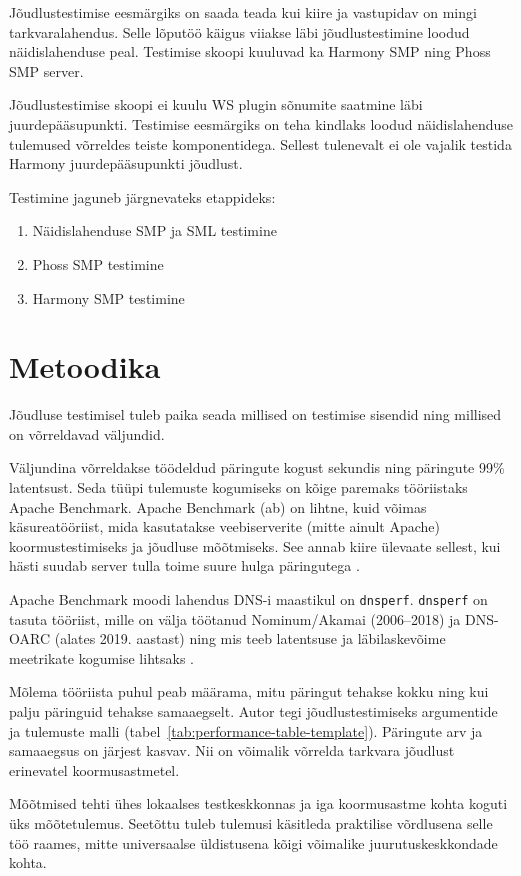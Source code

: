 Jõudlustestimise eesmärgiks on saada teada kui kiire ja vastupidav on mingi tarkvaralahendus.
Selle lõputöö käigus viiakse läbi jõudlustestimine loodud näidislahenduse peal. 
Testimise skoopi kuuluvad ka Harmony SMP ning Phoss SMP server.

Jõudlustestimise skoopi ei kuulu WS plugin sõnumite saatmine läbi juurdepääsupunkti. 
Testimise eesmärgiks on teha kindlaks loodud näidislahenduse tulemused võrreldes teiste komponentidega.
Sellest tulenevalt ei ole vajalik testida Harmony juurdepääsupunkti jõudlust.

Testimine jaguneb järgnevateks etappideks:

\begin{enumerate}
  \item Näidislahenduse SMP ja SML testimine
  \item Phoss SMP testimine
  \item Harmony SMP testimine
\end{enumerate}


\section{Metoodika}
Jõudluse testimisel tuleb paika seada millised on testimise sisendid ning
millised on võrreldavad väljundid.

Väljundina võrreldakse töödeldud päringute kogust sekundis ning päringute 99\% latentsust.
Seda tüüpi tulemuste kogumiseks on kõige paremaks tööriistaks Apache Benchmark. Apache Benchmark (ab)
on lihtne, kuid võimas käsureatööriist, mida kasutatakse veebiserverite (mitte ainult Apache) 
koormustestimiseks ja jõudluse mõõtmiseks. See annab kiire ülevaate sellest, kui hästi suudab 
server tulla toime suure hulga päringutega \cite{apache_ab_tool}. 

Apache Benchmark moodi lahendus DNS-i maastikul on \texttt{dnsperf}. \texttt{dnsperf} on tasuta tööriist,
mille on välja töötanud Nominum/Akamai (2006–2018) ja DNS-OARC (alates 2019. aastast)
ning mis teeb latentsuse ja läbilaskevõime meetrikate kogumise lihtsaks \cite{dnsperf_tool}.

Mõlema tööriista puhul peab määrama, mitu päringut tehakse kokku ning kui palju
päringuid tehakse samaaegselt. Autor tegi jõudlustestimiseks argumentide ja tulemuste malli
(tabel~\ref{tab:performance-table-template}). Päringute arv ja samaaegsus on järjest kasvav.
Nii on võimalik võrrelda tarkvara jõudlust erinevatel koormusastmetel.

Mõõtmised tehti ühes lokaalses testkeskkonnas ja iga koormusastme kohta koguti üks mõõtetulemus.
Seetõttu tuleb tulemusi käsitleda praktilise võrdlusena selle töö raames, mitte universaalse
üldistusena kõigi võimalike juurutuskeskkondade kohta.

